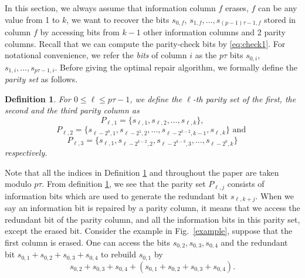 \documentclass[conference]{IEEEtran}
\newtheorem{defn}{Definition}
\begin{document}
In this section, we always assume that information column $f$ erases, $f$ can be any value from 1 to $k$, we want to recover the bits $s_{0,f}$, $s_{1,f}, \ldots, s_{(p-1)\tau-1,f}$ stored in column $f$ by accessing bits from $k-1$ other information columns and 2 parity columns. Recall that we can compute the parity-check bits by \eqref{eq:check1}. For notational convenience, we refer the \emph{bits} of column $i$ as the $p\tau$ bits $s_{0,i}$, $s_{1,i}, \ldots, s_{p\tau-1,i}$.
Before giving the optimal repair algorithm, we formally define the \emph{parity set} as follows.
\begin{defn}
For $0\leq \ell \leq p\tau-1$, we define the $\ell$-th parity set of the first, the second and the third parity column as $$P_{\ell,1}=\{s_{\ell,1},s_{\ell,2},\ldots,s_{\ell,k}\},$$
$$P_{\ell,2}=\{s_{\ell-2^{0},1},s_{ \ell-2^{1},2},\ldots,s_{ \ell-2^{k-2},k-1},s_{\ell,k}\} \text{ and }$$
$$P_{\ell,3}=\{s_{\ell,1},s_{ \ell-2^{k-2},2},s_{ \ell-2^{k-3},3},\ldots,s_{ \ell-2^{0},k}\}$$ respectively.
\label{def1}
\end{defn}
Note that all the indices in Definition \ref{def1} and throughout the paper are taken modulo $p\tau$. From definition \ref{def1}, we see that the parity set $P_{\ell,j}$ consists of information bits which are used to generate the redundant bit $s_{\ell,k+j}$. When we say an information bit is repaired by a parity column, it means that we access the redundant bit of the parity column, and all the information bits in this parity set, except the erased bit.
Consider the example in Fig.~\ref{example}, suppose that the first column is erased. One can access the bits $s_{0,2},s_{0,3},s_{0,4}$ and the redundant bit $s_{0,1}+s_{0,2}+s_{0,3}+s_{0,4}$ to rebuild $s_{0,1}$ by
$$s_{0,2}+s_{0,3}+s_{0,4}+(s_{0,1}+s_{0,2}+s_{0,3}+s_{0,4}).$$

\end{document}
